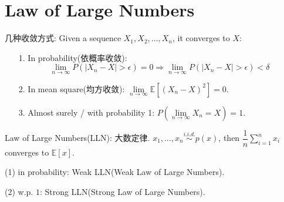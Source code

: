 \section{Law of Large Numbers}

几种收敛方式:
Given a sequence $X_1,X_2,\ldots,X_n$, it converges to $X$:
\begin{itemize}
\item[1.] In probability(依概率收敛):
$$\lim\limits_{n\to\infty}P\left(|X_n-X|>\epsilon\right)=0\Rightarrow\lim\limits_{n\to\infty}P\left(|X_n-X|>\epsilon\right)<\delta$$
\item[2.] In mean square(均方收敛): $\lim\limits_{n\to\infty}\mathbb{E}\left[(X_n-X)^2\right]=0$.
\item[3.] Almost surely / with probability 1: $P\left(\lim\limits_{n\to\infty}X_n=X\right)=1$.
\end{itemize}

Law of Large Numbers(LLN): 大数定律.
$x_1,\ldots,x_n\stackrel{i.i.d.}{\sim}p(x)$, then $\dfrac{1}{n}\sum\limits_{i=1}^nx_i$ converges to $\mathbb{E}[x]$.

(1) in probability: Weak LLN(Weak Law of Large Numbers).

(2) w.p. $1$: Strong LLN(Strong Law of Large Numbers).